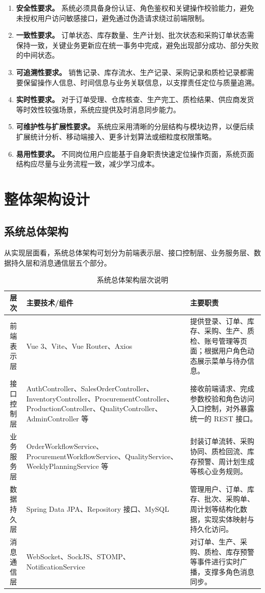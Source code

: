 \begin{enumerate}
  \item \textbf{安全性要求。} 系统必须具备身份认证、角色鉴权和关键操作校验能力，避免未授权用户访问敏感接口，避免通过伪造请求绕过前端限制。
  \item \textbf{一致性要求。} 订单状态、库存数量、生产计划、批次状态和采购订单状态需保持一致，关键业务更新应在统一事务中完成，避免出现部分成功、部分失败的中间状态。
  \item \textbf{可追溯性要求。} 销售记录、库存流水、生产记录、采购记录和质检记录都需要保留操作人信息、时间信息与业务关联信息，以支撑责任定位与质量追溯。
  \item \textbf{实时性要求。} 对于订单受理、仓库核查、生产完工、质检结果、供应商发货等时效性较强场景，系统应提供及时消息同步能力。
  \item \textbf{可维护性与扩展性要求。} 系统应采用清晰的分层结构与模块边界，以便后续扩展统计分析、移动端接入、更多计划算法或细粒度权限策略。
  \item \textbf{易用性要求。} 不同岗位用户应能基于自身职责快速定位操作页面，系统页面结构应尽量与业务流程一致，减少学习成本。
\end{enumerate}

\section{整体架构设计}

\subsection{系统总体架构}

从实现层面看，系统总体架构可划分为前端表示层、接口控制层、业务服务层、数据持久层和消息通信层五个部分。

\begin{table}[htbp]
\centering
\footnotesize
\caption{系统总体架构层次说明}
\label{tab:overall-arch-layers}
\begin{tabular}{|c|p{3.4cm}|p{7.8cm}|}
\hline
层次 & 主要技术/组件 & 主要职责 \\\hline
前端表示层 & Vue 3、Vite、Vue Router、Axios & 提供登录、订单、库存、采购、生产、质检、账号管理等页面；根据用户角色动态展示菜单与待办信息。 \\\hline
接口控制层 & AuthController、SalesOrderController、InventoryController、ProcurementController、ProductionController、QualityController、AdminController 等 & 接收前端请求、完成参数校验和角色访问入口控制，对外暴露统一的 REST 接口。 \\\hline
业务服务层 & OrderWorkflowService、ProcurementWorkflowService、QualityService、WeeklyPlanningService 等 & 封装订单流转、采购协同、质检回流、库存预警、周计划生成等核心业务规则。 \\\hline
数据持久层 & Spring Data JPA、Repository 接口、MySQL & 管理用户、订单、库存、批次、采购单、周计划等结构化数据，实现实体映射与持久化访问。 \\\hline
消息通信层 & WebSocket、SockJS、STOMP、NotificationService & 对订单、生产、采购、质检、库存预警等事件进行实时广播，支撑多角色消息同步。 \\\hline
\end{tabular}
\end{table}

